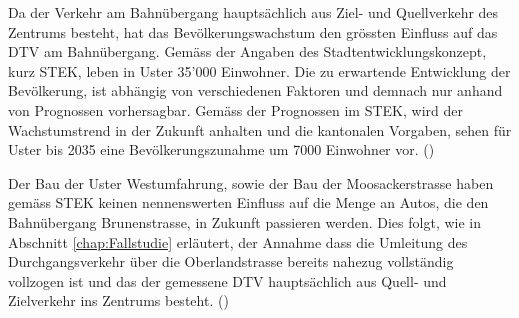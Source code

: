 Da der Verkehr am Bahnübergang hauptsächlich aus Ziel- und Quellverkehr des Zentrums besteht, hat das Bevölkerungswachstum den grössten Einfluss auf das DTV am Bahnübergang. Gemäss der Angaben des Stadtentwicklungskonzept, kurz STEK, leben in Uster 35'000 Einwohner. Die zu erwartende Entwicklung der Bevölkerung, ist abhängig von verschiedenen Faktoren und demnach nur anhand von Prognossen vorhersagbar. Gemäss der Prognossen im STEK, wird der Wachstumstrend in der Zukunft anhalten und die kantonalen Vorgaben, sehen für Uster bis 2035 eine Bevölkerungszunahme um 7000 Einwohner vor.  (\cite{STEK})

Der Bau der Uster Westumfahrung, sowie der Bau der Moosackerstrasse haben gemäss STEK keinen nennenswerten Einfluss auf die Menge an Autos, die den Bahnübergang Brunenstrasse, in Zukunft passieren werden. Dies folgt, wie in Abschnitt \ref{chap:Fallstudie} erläutert, der Annahme dass die Umleitung des Durchgangsverkehr über die Oberlandstrasse bereits nahezug vollständig vollzogen ist und das der gemessene DTV hauptsächlich aus Quell- und Zielverkehr ins Zentrums besteht.  (\cite{STEK})

\newpage


%

